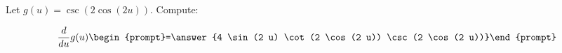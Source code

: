 \documentclass{ximera}
\author{Bart Snapp}
\begin{document}
\begin{exercise}
Let $g(u) = \csc (2 \cos (2 u))$. Compute:

\[
\frac{d}{du}g(u)
\begin{prompt}=\answer{4 \sin (2 u) \cot (2 \cos (2 u)) \csc (2 \cos (2 u))}\end{prompt}
\]
\end{exercise}
\end{document}
